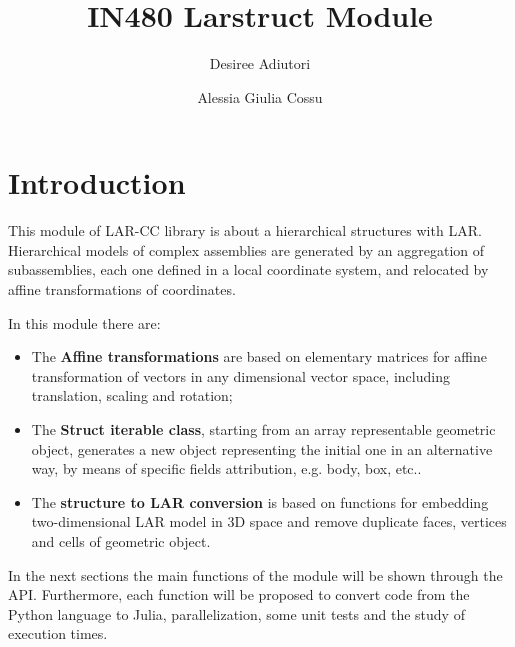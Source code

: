 \documentclass[a4paper,12pt]{article}
\begin{document}
\title{IN480 \hspace{0.5cm} Larstruct Module}
\author{Desiree Adiutori \and Alessia Giulia Cossu}
\maketitle
\tableofcontents
\newpage
\section*{Introduction}
This module of LAR-CC library is about a hierarchical structures with LAR.
Hierarchical models of complex assemblies are generated by an aggregation of subassemblies, each one defined in a local coordinate system, and relocated by affine transformations of coordinates.

In this module there are:
\begin{itemize}
\item The \textbf{Affine transformations} are based on elementary matrices for affine transformation of vectors in any dimensional vector space, including translation, scaling and rotation;
\item The \textbf{Struct iterable class}, starting from an array representable geometric object, generates a new object representing the initial one in an alternative way, by means of specific fields attribution, e.g. body, box, etc..
\item The \textbf{structure to LAR conversion} is based on functions for embedding two-dimensional LAR model in 3D space and remove duplicate faces, vertices and cells of geometric object. 
\end{itemize}
In the next sections the main functions of the module will be shown through the API. Furthermore, each function will be proposed to convert code from the Python language to Julia, parallelization, some unit tests and the study of execution times.
\newpage
\end{document}
